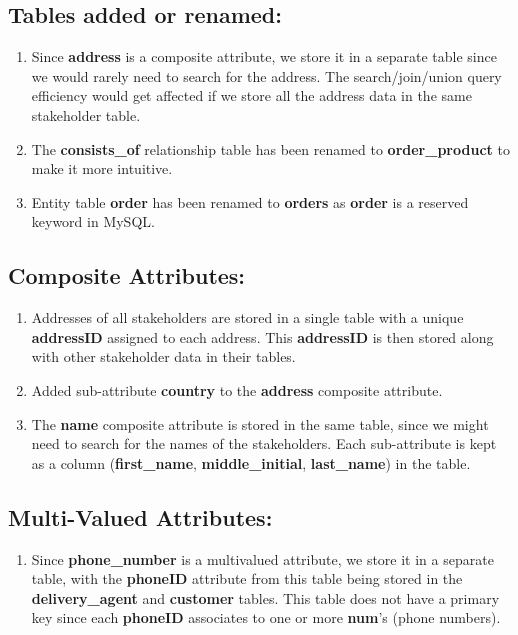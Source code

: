 \documentclass[12pt]{report}
\begin{document}
    \subsection*{Tables added or renamed:}
    \begin{enumerate}
        \item
        Since \textbf{address} is a composite attribute, we store it in a separate table since we would rarely need to search for the address.
        The search/join/union query efficiency would get affected if we store all the address data in the same stakeholder table.
        \item
        The \textbf{consists\_of} relationship table has been renamed to \textbf{order\_product} to make it more intuitive.
        \item
        Entity table \textbf{order} has been renamed to \textbf{orders} as \textbf{order} is a reserved keyword in MySQL.
    \end{enumerate}

    \subsection*{Composite Attributes:}
    \begin{enumerate}
        \item
        Addresses of all stakeholders are stored in a single table with a unique \textbf{addressID} assigned to each address.
        This \textbf{addressID} is then stored along with other stakeholder data in their tables.
        \item
        Added sub-attribute \textbf{country} to the \textbf{address} composite attribute.
        \item
        The \textbf{name} composite attribute is stored in the same table, since we might need to search for the names of the stakeholders.
        Each sub-attribute is kept as a column (\textbf{first\_name}, \textbf{middle\_initial}, \textbf{last\_name}) in the table.
    \end{enumerate}

    \subsection*{Multi-Valued Attributes:}
    \begin{enumerate}
        \item
        Since \textbf{phone\_number} is a multivalued attribute, we store it in a separate table, with the \textbf{phoneID} attribute from this table being stored in the \textbf{delivery\_agent} and \textbf{customer} tables.
        This table does not have a primary key since each \textbf{phoneID} associates to one or more \textbf{num}'s (phone numbers).
    \end{enumerate}
\end{document}
